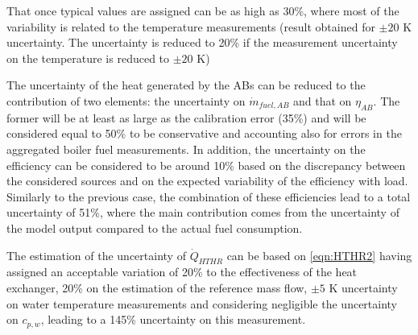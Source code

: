 \documentclass[]{article}
\begin{document}
That once typical values are assigned can be as high as 30\%, where most of the variability is related to the temperature measurements (result obtained for $\pm 20$ K uncertainty. The uncertainty is reduced to 20\% if the measurement uncertainty on the temperature is reduced to  $\pm 20$ K) 

The uncertainty of the heat generated by the ABs can be reduced to the contribution of two elements: the uncertainty on $\dot{m}_{fuel,AB}$ and that on $\eta_{AB}$. The former will be at least as large as the calibration error (35\%) and will be considered equal to 50\% to be conservative and accounting also for errors in the aggregated boiler fuel measurements. In addition, the uncertainty on the efficiency can be considered to be around 10\% based on the discrepancy between the considered sources and on the expected variability of the efficiency with load. Similarly to the previous case, the combination of these efficiencies lead to a total uncertainty of 51\%, where the main contribution comes from the uncertainty of the model output compared to the actual fuel consumption.

The estimation of the uncertainty of $\dot{Q}_{HTHR}$ can be based on \ref{eqn:HTHR2} having assigned an acceptable variation of 20\% to the effectiveness of the heat exchanger, 20\% on the estimation of the reference mass flow, $\pm 5$ K uncertainty on water temperature measurements and considering negligible the uncertainty on $c_{p,w}$, leading to a 145\% uncertainty on this measurement. 
\end{document}
